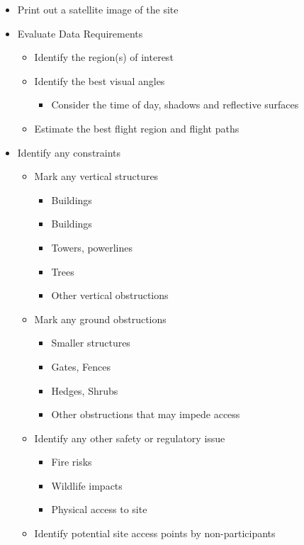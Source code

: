 \documentclass[
]{book}
\providecommand{\tightlist}{%
  \setlength{\itemsep}{0pt}\setlength{\parskip}{0pt}}
\begin{document}
\begin{itemize}
\tightlist
\item
  Print out a satellite image of the site
\item
  Evaluate Data Requirements

  \begin{itemize}
  \tightlist
  \item
    Identify the region(s) of interest
  \item
    Identify the best visual angles

    \begin{itemize}
    \tightlist
    \item
      Consider the time of day, shadows and reflective surfaces
    \end{itemize}
  \item
    Estimate the best flight region and flight paths
  \end{itemize}
\item
  Identify any constraints

  \begin{itemize}
  \tightlist
  \item
    Mark any vertical structures

    \begin{itemize}
    \tightlist
    \item
      Buildings
    \item
      Buildings
    \item
      Towers, powerlines
    \item
      Trees
    \item
      Other vertical obstructions
    \end{itemize}
  \item
    Mark any ground obstructions

    \begin{itemize}
    \tightlist
    \item
      Smaller structures
    \item
      Gates, Fences
    \item
      Hedges, Shrubs
    \item
      Other obstructions that may impede access
    \end{itemize}
  \item
    Identify any other safety or regulatory issue

    \begin{itemize}
    \tightlist
    \item
      Fire risks
    \item
      Wildlife impacts
    \item
      Physical access to site
    \end{itemize}
  \item
    Identify potential site access points by non-participants


\end{itemize}
\end{itemize}
\end{document}

